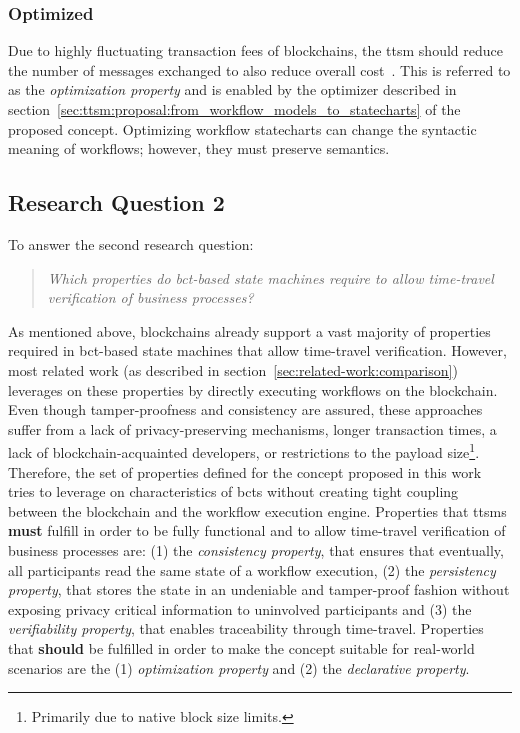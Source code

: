 \subsubsection{Optimized}
\label{sec:ttsm:properties:optimized}
Due to highly fluctuating transaction fees of blockchains, the \gls{ttsm} should reduce the number of messages exchanged to also reduce overall cost~\cite{predicting_cryptocurrency_price_bubbles}. This is referred to as the \textit{optimization property} and is enabled by the optimizer described in section~\ref{sec:ttsm:proposal:from_workflow_models_to_statecharts} of the proposed concept. Optimizing workflow statecharts can change the syntactic meaning of workflows; however, they must preserve semantics.


\subsection{Research Question 2}
\label{sec:ttsm:properties:rq2}
To answer the second research question:

\begin{quote}
    \emph{Which properties do \gls{bct}-based state machines require to allow time-travel verification of business processes?}
\end{quote}

As mentioned above, blockchains already support a vast majority of properties required in \gls{bct}-based state machines that allow time-travel verification. However, most related work (as described in section~\ref{sec:related-work:comparison}) leverages on these properties by directly executing workflows on the blockchain. Even though tamper-proofness and consistency are assured, these approaches suffer from a lack of privacy-preserving mechanisms, longer transaction times, a lack of blockchain-acquainted developers, or restrictions to the payload size\footnote{Primarily due to native block size limits.}. Therefore, the set of properties defined for the concept proposed in this work tries to leverage on characteristics of \glspl{bct} without creating tight coupling between the blockchain and the workflow execution engine. Properties that \glspl{ttsm} \textbf{must} fulfill in order to be fully functional and to allow time-travel verification of business processes are: (1) the \textit{consistency property}, that ensures that eventually, all participants read the same state of a workflow execution, (2) the \textit{persistency property}, that stores the state in an undeniable and tamper-proof fashion without exposing privacy critical information to uninvolved participants and (3) the \textit{verifiability property}, that enables traceability through time-travel. Properties that \textbf{should} be fulfilled in order to make the concept suitable for real-world scenarios are the (1) \textit{optimization property} and (2) the \textit{declarative property}.

